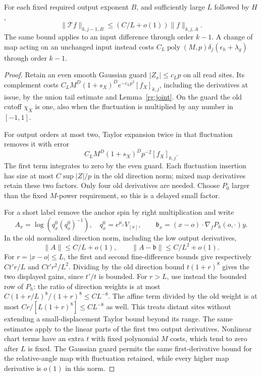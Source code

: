 \begin{lemma}
\label{rg:error-contraction}
For each fixed required output exponent $B$, and sufficiently large
$L$ followed by $H$,
\begin{equation}
 \|\mathcal T f\|_{k,j-1,B}
                  \le (C/L+o(1))\|f\|_{k,j,A}.
 \label{rg:error-contraction-bound}
\end{equation}
The same bound applies to an input difference through order $k-1$.
A change of map acting on an unchanged input instead costs
$C_L\operatorname{poly}(M,p)\delta_j(\epsilon_h+\lambda_g)$
through order $k-1$.
\end{lemma}
\begin{proof}
Retain an even smooth Gaussian guard $|Z_x|\le c_Lp$ on all read
sites.  Its complement costs
$C_LM^D(1+s_X)^De^{-c_Lp^2}[f_X]_{k,j}$, including the derivatives
at issue, by the union tail estimate and Lemma~\ref{rg:joint}.
On the guard the old cutoff $\chi_X$ is one, also when the
fluctuation is multiplied by any number in $[-1,1]$.

For output orders at most two, Taylor expansion twice in that
fluctuation removes it with error
\begin{equation}
 C_LM^D(1+s_X)^Dp^{-2}[f_X]_{k,j}.
 \label{rg:fluctuation-omission}
\end{equation}
The first term integrates to zero by the even guard.  Each
fluctuation insertion has size at most $C\sup|Z|/p$ in the old
direction norm; mixed map derivatives retain these two factors.
Only four old derivatives are needed.  Choose $P_0$ larger than
the fixed $M$-power requirement, so this is a delayed small factor.

For a short label remove the anchor spin by right multiplication
and write
\[
 A_x=\log(q_x^0(q_o^0)^{-1}),\quad q_x^0=e^{\mu_x}V_{[x]},
 \qquad
 \mathfrak b_x=(x-o)\cdot\nabla_fP_h(o,\cdot)y.
\]
In the old normalized direction norm, including the low output
derivatives,
\begin{equation}
 \|A\|\le C/L+o(1),\qquad
 \|A-\mathfrak b\|\le C/L^2+o(1).
 \label{rg:affine-prediction}
\end{equation}
For $r=|x-o|\le L$, the first and second fine-difference bounds
give respectively $Ct'r/L$ and $Ct'r^2/L^2$.  Dividing by the old
direction bound $t(1+r)^8$ gives the two displayed gains, since
$t'/t$ is bounded.  For $r>L$, use instead the bounded row of $P_h$:
the ratio of direction weights is at most
$C(1+r/L)^8/(1+r)^8\le CL^{-8}$.
The affine term divided by the old weight is at most
$Cr/[L(1+r)^8]\le CL^{-8}$ as well.  This treats distant sites
without extending a small-displacement Taylor bound beyond its range.
The same estimates apply to the linear parts of the first two output
derivatives.  Nonlinear chart terms have an extra $t$ with fixed
polynomial $M$ costs, which tend to zero after $L$ is fixed.
The Gaussian guard
permits the same first-derivative bound for the relative-angle
map with fluctuation retained, while every higher map derivative
is $o(1)$ in this norm.


\end{proof}
